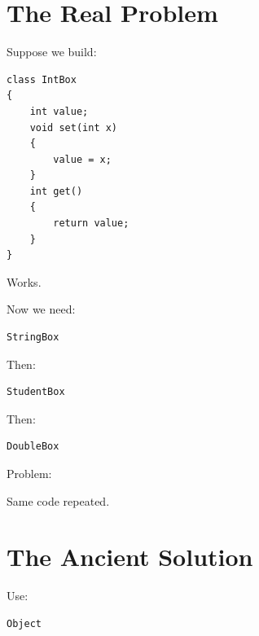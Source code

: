 \documentclass[11pt,a4paper]{book}
\begin{document}

\section{The Real Problem}

Suppose we build:

\begin{verbatim}
class IntBox
{
    int value;
    void set(int x)
    {
        value = x;
    }
    int get()
    {
        return value;
    }
}
\end{verbatim}


Works.


Now we need:

\begin{verbatim}
StringBox
\end{verbatim}


Then:

\begin{verbatim}
StudentBox
\end{verbatim}


Then:

\begin{verbatim}
DoubleBox
\end{verbatim}


Problem:

Same code repeated.


\section{The Ancient Solution}

Use:

\begin{verbatim}
Object
\end{verbatim}

\end{document}
